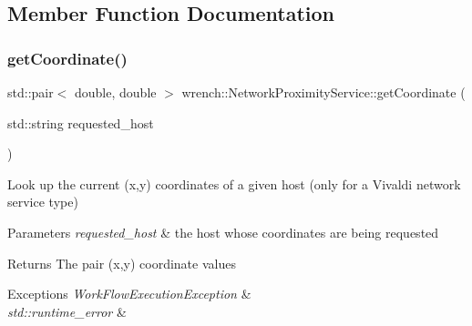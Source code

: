 \subsection{Member Function Documentation}
\mbox{\label{classwrench_1_1_network_proximity_service_af7392b6f906fa758328de9cfa283d1bc}} 
\subsubsection{\texorpdfstring{get\+Coordinate()}{getCoordinate()}}
{\footnotesize\ttfamily std\+::pair$<$ double, double $>$ wrench\+::\+Network\+Proximity\+Service\+::get\+Coordinate (\begin{DoxyParamCaption}\item[{std\+::string}]{requested\+\_\+host }\end{DoxyParamCaption})}



Look up the current (x,y) coordinates of a given host (only for a Vivaldi network service type) 


\begin{DoxyParams}{Parameters}
{\em requested\+\_\+host} & the host whose coordinates are being requested \\
\hline
\end{DoxyParams}
\begin{DoxyReturn}{Returns}
The pair (x,y) coordinate values
\end{DoxyReturn}

\begin{DoxyExceptions}{Exceptions}
{\em Work\+Flow\+Execution\+Exception} & \\
\hline
{\em std\+::runtime\+\_\+error} & \\
\hline
\end{DoxyExceptions}
\mbox{\label{classwrench_1_1_network_proximity_service_a5e3f4189424c2d44db198efb7984e3ef}} 
